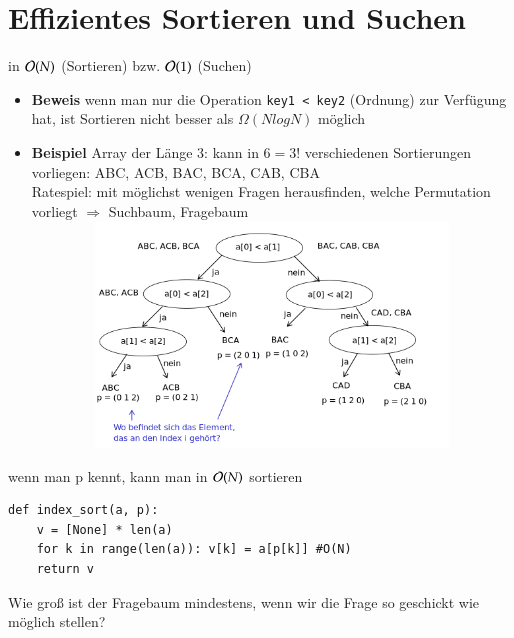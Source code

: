 
\chapter{Effizientes Sortieren und Suchen}
in $\mathcal{O}{}(N)$ (Sortieren) bzw. $\mathcal{O}{}(1)$ (Suchen) \\
\begin{itemize}[label={}]
    \item \textbf{Beweis} wenn man nur die Operation \verb|key1 < key2| (Ordnung) zur Verfügung hat, ist Sortieren nicht besser als $\Omega (NlogN)$ möglich
    \item \textbf{Beispiel} Array der Länge 3: kann in $ 6 = 3!$ verschiedenen Sortierungen vorliegen: ABC, ACB, BAC, BCA, CAB, CBA \\
    Ratespiel: mit möglichst wenigen Fragen herausfinden, welche Permutation vorliegt $\Rightarrow$ Suchbaum, Fragebaum \\
    \includegraphics[width=16cm,height=6cm,keepaspectratio]{./Pictures/Fragebaum.png}
\end{itemize}
wenn man p kennt, kann man in $\mathcal{O}{}(N)$ sortieren
\begin{verbatim}
def index_sort(a, p):
    v = [None] * len(a)
    for k in range(len(a)): v[k] = a[p[k]] #O(N)
    return v
\end{verbatim}
\vspace*{0.5cm}
Wie groß ist der Fragebaum mindestens, wenn wir die Frage so geschickt wie möglich stellen?
